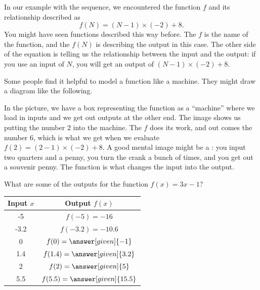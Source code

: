 \documentclass{ximera}
\begin{document}
In our example with the sequence, we encountered the function $f$ and its relationship described as 
\[
f(N) = (N-1) \times (-2) + 8.
\]
You might have seen functions described this way before. The $f$ is the name of the function, and the $f(N)$ is describing the output in this case. The other side of the equation is telling us the relationship between the input and the output: if you use an input of $N$, you will get an output of $(N-1) \times (-2) + 8$.

Some people find it helpful to model a function like a machine. They might draw a diagram like the following.
\begin{image}
\end{image} 
In the picture, we have a box representing the function as a ``machine'' where we load in inputs and we get out outputs at the other end. The image shows us putting the number $2$ into the machine. The $f$ does its work, and out comes the number $6$, which is what we get when we evaluate $f(2) = (2-1)\times(-2)+8$. A good mental image might be a : you input two quarters and a penny, you turn the crank a bunch of times, and you get out a souvenir penny. The function is what changes the input into the output.

\begin{question}
What are some of the outputs for the function $f(x) = 3x-1$?

\begin{prompt}
\begin{tabular}{c|c}
Input $x$ & Output $f(x)$ \\ \hline
-5 & $f(-5) = -16$ \\ \hline
-3.2 & $f(-3.2) = -10.6$ \\ \hline
0 & $f(0) = \answer[given]{-1}$ \\ \hline
1.4 & $f(1.4) = \answer[given]{3.2}$ \\ \hline
2 & $f(2) = \answer[given]{5}$ \\ \hline
5.5 & $f(5.5) = \answer[given]{15.5}$ \\ \hline
\end{tabular}
\end{prompt}
\end{question}
\end{document}
